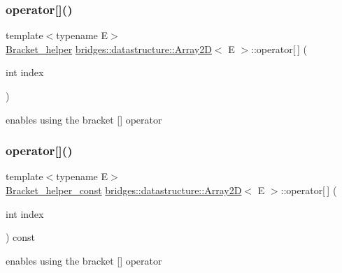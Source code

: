 \subsubsection{\texorpdfstring{operator[]()}{operator[]()}\hspace{0.1cm}{\footnotesize\ttfamily [1/2]}}
{\footnotesize\ttfamily template$<$typename E$>$ \\
\hyperlink{structbridges_1_1datastructure_1_1_array2_d_1_1_bracket__helper}{Bracket\+\_\+helper} \hyperlink{classbridges_1_1datastructure_1_1_array2_d}{bridges\+::datastructure\+::\+Array2D}$<$ E $>$\+::operator\mbox{[}$\,$\mbox{]} (\begin{DoxyParamCaption}\item[{int}]{index }\end{DoxyParamCaption})\hspace{0.3cm}{\ttfamily [inline]}}



enables using the bracket \mbox{[}\mbox{]} operator 

\mbox{\label{classbridges_1_1datastructure_1_1_array2_d_a427adc67a85ec12e765199448ac82ec2}} 
\subsubsection{\texorpdfstring{operator[]()}{operator[]()}\hspace{0.1cm}{\footnotesize\ttfamily [2/2]}}
{\footnotesize\ttfamily template$<$typename E$>$ \\
\hyperlink{structbridges_1_1datastructure_1_1_array2_d_1_1_bracket__helper__const}{Bracket\+\_\+helper\+\_\+const} \hyperlink{classbridges_1_1datastructure_1_1_array2_d}{bridges\+::datastructure\+::\+Array2D}$<$ E $>$\+::operator\mbox{[}$\,$\mbox{]} (\begin{DoxyParamCaption}\item[{int}]{index }\end{DoxyParamCaption}) const\hspace{0.3cm}{\ttfamily [inline]}}



enables using the bracket \mbox{[}\mbox{]} operator 

\mbox{\label{classbridges_1_1datastructure_1_1_array2_d_a2bd2ef3a200e4a07a4d45534bd31387d}} 

